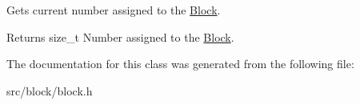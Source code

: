 Gets current number assigned to the \mbox{\hyperlink{class_block}{Block}}. 

\begin{DoxyReturn}{Returns}
size\+\_\+t Number assigned to the \mbox{\hyperlink{class_block}{Block}}. 
\end{DoxyReturn}


The documentation for this class was generated from the following file\+:\begin{DoxyCompactItemize}
\item 
src/block/block.\+h\end{DoxyCompactItemize}
